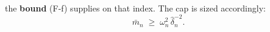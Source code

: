 \begin{definition}
the \textbf{bound} \textup{(F-f)} supplies on that index. The cap is sized accordingly:
\begin{equation}\label{eq:cap}
\bar m_n\;\ge\;\omega_n^{2}\,\hat\delta_n^{-2} .
\end{equation}


\end{definition}
